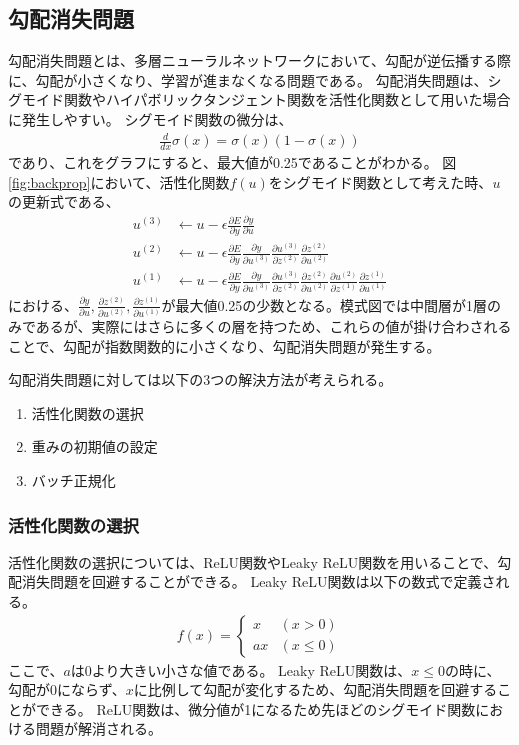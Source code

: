 \documentclass{ltjsarticle}
\begin{document}
\subsection{勾配消失問題}
勾配消失問題とは、多層ニューラルネットワークにおいて、勾配が逆伝播する際に、勾配が小さくなり、学習が進まなくなる問題である。
勾配消失問題は、シグモイド関数やハイパボリックタンジェント関数を活性化関数として用いた場合に発生しやすい。
シグモイド関数の微分は、
\begin{align}
  \frac{d}{dx}\sigma(x) = \sigma(x)(1 - \sigma(x))
\end{align}
であり、これをグラフにすると、最大値が0.25であることがわかる。
図\ref{fig:backprop}において、活性化関数$f(u)$をシグモイド関数として考えた時、$u$の更新式である、
\begin{align}
  u^{(3)} &\leftarrow u - \epsilon \frac{\partial E}{\partial y}\frac{\partial y}{\partial u}\\
  u^{(2)} &\leftarrow u - \epsilon \frac{\partial E}{\partial y}\frac{\partial y}{\partial u^{(3)}} \frac{\partial u^{(3)}}{\partial z^{(2)}} \frac{\partial z^{(2)}}{\partial u^{(2)}}\\
  u^{(1)} &\leftarrow u - \epsilon \frac{\partial E}{\partial y} \frac{\partial y}{\partial u^{(3)}} \frac{\partial u^{(3)}}{\partial z^{(2)}} \frac{\partial z^{(2)}}{\partial u^{(2)}} \frac{\partial u^{(2)}}{\partial z^{(1)}} \frac{\partial z^{(1)}}{\partial u^{(1)}}
\end{align}
における、$\frac{\partial y}{\partial u}, \frac{\partial z^{(2)}}{\partial u^{(2)}}, \frac{\partial z^{(1)}}{\partial u^{(1)}}$が最大値0.25の少数となる。模式図では中間層が1層のみであるが、実際にはさらに多くの層を持つため、これらの値が掛け合わされることで、勾配が指数関数的に小さくなり、勾配消失問題が発生する。
\par
勾配消失問題に対しては以下の3つの解決方法が考えられる。
\begin{enumerate}
  \item 活性化関数の選択
  \item 重みの初期値の設定
  \item バッチ正規化
\end{enumerate}

\subsubsection{活性化関数の選択}
活性化関数の選択については、ReLU関数やLeaky ReLU関数を用いることで、勾配消失問題を回避することができる。
Leaky ReLU関数は以下の数式で定義される。
\begin{align}
  f(x) = \begin{cases}
    x & (x > 0)\\
    ax & (x \leq 0)
  \end{cases}
\end{align}
ここで、$a$は0より大きい小さな値である。
Leaky ReLU関数は、$x \leq 0$の時に、勾配が0にならず、$x$に比例して勾配が変化するため、勾配消失問題を回避することができる。
ReLU関数は、微分値が1になるため先ほどのシグモイド関数における問題が解消される。
\end{document}
